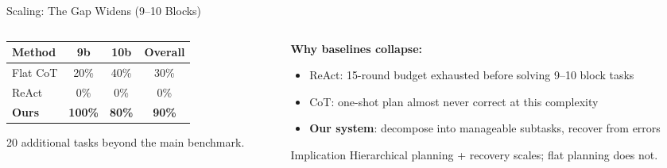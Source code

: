\documentclass[aspectratio=169]{beamer}
\begin{document}
\begin{frame}{Scaling: The Gap Widens (9--10 Blocks)}

\begin{columns}[T]
\begin{column}{0.48\textwidth}
\centering
\begin{tabular}{lccc}
\toprule
\textbf{Method} & \textbf{9b} & \textbf{10b} & \textbf{Overall} \\
\midrule
Flat CoT & 20\% & 40\% & 30\% \\
ReAct & 0\% & 0\% & 0\% \\
\textbf{Ours} & \textbf{100\%} & \textbf{80\%} & \textbf{90\%} \\
\bottomrule
\end{tabular}

\vspace{0.4cm}
{\small 20 additional tasks beyond the main benchmark.}
\end{column}

\begin{column}{0.48\textwidth}
\textbf{Why baselines collapse:}
\begin{itemize}
    \item ReAct: 15-round budget exhausted before solving 9--10 block tasks
    \item CoT: one-shot plan almost never correct at this complexity
    \item \textbf{Our system}: decompose into manageable subtasks, recover from errors
\end{itemize}

\vspace{0.2cm}
\begin{block}{Implication}
Hierarchical planning + recovery scales; flat planning does not.
\end{block}
\end{column}
\end{columns}

\end{frame}
\end{document}
